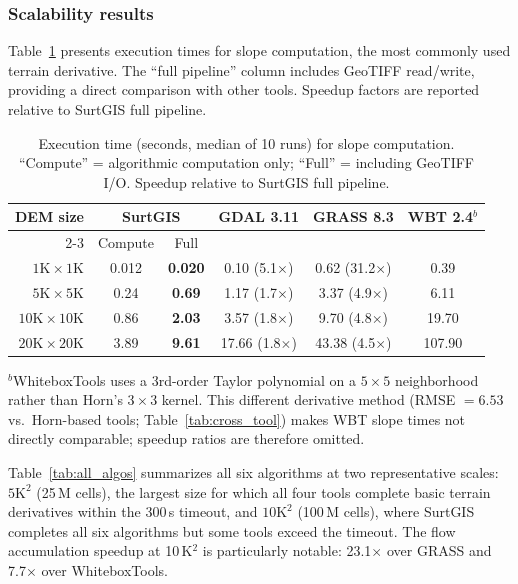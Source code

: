 \documentclass[preprint,review,12pt,authoryear]{elsarticle}
\begin{document}
\subsubsection{Scalability results}

Table~\ref{tab:slope_results} presents execution times for slope computation, the most commonly used terrain derivative. The ``full pipeline'' column includes GeoTIFF read/write, providing a direct comparison with other tools. Speedup factors are reported relative to SurtGIS full pipeline.

\begin{table}[htbp]
\centering
\caption{Execution time (seconds, median of 10 runs) for slope computation. ``Compute'' = algorithmic computation only; ``Full'' = including GeoTIFF I/O. Speedup relative to SurtGIS full pipeline.}
\label{tab:slope_results}
\begin{tabular}{@{}rccccc@{}}
\toprule
DEM size & \multicolumn{2}{c}{SurtGIS} & GDAL 3.11 & GRASS 8.3 & WBT 2.4$^{b}$ \\
\cmidrule(lr){2-3}
 & Compute & Full & & & \\
\midrule
$1\text{K} \times 1\text{K}$     & 0.012 & \textbf{0.020} & 0.10 (5.1$\times$) & 0.62 (31.2$\times$) & 0.39 \\
$5\text{K} \times 5\text{K}$     & 0.24  & \textbf{0.69}  & 1.17 (1.7$\times$) & 3.37 (4.9$\times$)  & 6.11 \\
$10\text{K} \times 10\text{K}$   & 0.86  & \textbf{2.03}  & 3.57 (1.8$\times$) & 9.70 (4.8$\times$)  & 19.70 \\
$20\text{K} \times 20\text{K}$   & 3.89  & \textbf{9.61}   & 17.66 (1.8$\times$) & 43.38 (4.5$\times$)  & 107.90 \\
\bottomrule
\end{tabular}
\smallskip

{\footnotesize $^{b}$WhiteboxTools uses a 3rd-order Taylor polynomial on a $5 \times 5$ neighborhood \citep{florinsky2016} rather than Horn's $3 \times 3$ kernel. This different derivative method (RMSE $= 6.53$\textdegree{} vs.\ Horn-based tools; Table~\ref{tab:cross_tool}) makes WBT slope times not directly comparable; speedup ratios are therefore omitted.}
\end{table}

Table~\ref{tab:all_algos} summarizes all six algorithms at two representative scales: $5\text{K}^2$ (25\,M cells), the largest size for which all four tools complete basic terrain derivatives within the 300\,s timeout, and $10\text{K}^2$ (100\,M cells), where SurtGIS completes all six algorithms but some tools exceed the timeout. The flow accumulation speedup at 10\,K$^2$ is particularly notable: 23.1$\times$ over GRASS and 7.7$\times$ over WhiteboxTools.
\end{document}
